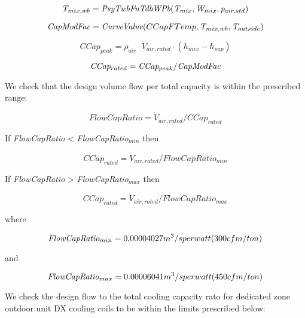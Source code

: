 \begin{equation}
\emph{T\(_{mix,wb}\)} = \emph{PsyTwbFnTdbWPb}(\emph{T\(_{mix}\)},\emph{W\(_{mix}\)}, \emph{p\(_{air,std}\)})
\end{equation}

\begin{equation}
\emph{CapModFac} = \emph{CurveValue}(CCapFTemp,\emph{T\(_{mix,wb}\)},\emph{T\(_{outside}\)})
\end{equation}

\begin{equation}
CCap_{peak} = \rho_{air} \cdot \dot V_{air,rated} \cdot (h_{mix} - h_{sup})
\end{equation}

\begin{equation}
\emph{CCap\(_{rated}\)} = \emph{CCap\(_{peak}\)}/ \emph{CapModFac}
\end{equation}

We check that the design volume flow per total capacity is within the prescribed range:

\begin{equation}
FlowCapRatio = \dot V_{air,rated} /CCap_{rated}
\end{equation}

If \emph{FlowCapRatio} \textless{} \emph{FlowCapRatio\(_{min}\)} then

\begin{equation}
CCap_{rated} = \dot V_{air,rated}/FlowCapRatio_{min}
\end{equation}

If \emph{FlowCapRatio} \textgreater{} \emph{FlowCapRatio\(_{max}\)} then

\begin{equation}
CCap_{rated} = \dot V_{air,rated} /FlowCapRatio_{max}
\end{equation}

where

\begin{equation}
\emph{FlowCapRatio\(_{min}\)} = 0.00004027 m^{3}/s per watt (300 cfm/ton)
\end{equation}

and

\begin{equation}
\emph{FlowCapRatio\(_{max}\)} = 0.00006041 m^{3}/s per watt (450 cfm/ton)
\end{equation}

We check the design flow to the total cooling capacity rato for dedicated zone outdoor unit DX cooling coils to be within the limits prescribed below:

